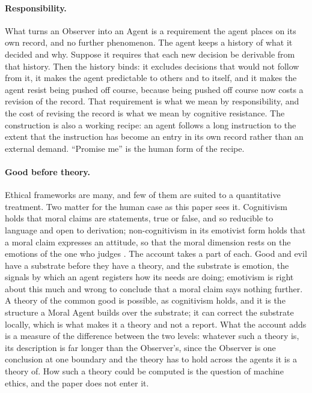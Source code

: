 \paragraph{Responsibility.}
\label{sec:responsibility}
What turns an Observer into an Agent is a requirement the agent places on its own record, and no
further phenomenon. The agent keeps a history of what it decided and why. Suppose it requires that each
new decision be derivable from that history. Then the history binds: it excludes decisions that would
not follow from it, it makes the agent predictable to others and to itself, and it makes the agent
resist being pushed off course, because being pushed off course now costs a revision of the record.
That requirement is what we mean by responsibility, and the cost of revising the record is what we
mean by cognitive resistance. The construction is also a working recipe: an agent follows a long
instruction to the extent that the instruction has become an entry in its own record rather than an
external demand. ``Promise me'' is the human form of the recipe.

\paragraph{Good before theory.}
Ethical frameworks are many, and few of them are suited to a quantitative treatment. Two matter for
the human case as this paper sees it. Cognitivism holds that moral claims are statements, true or
false, and so reducible to language and open to derivation; non-cognitivism in its emotivist form holds
that a moral claim expresses an attitude, so that the moral dimension rests on the emotions of the one
who judges \citep{ayer1936,vanroojen2023}. The account takes a part of each. Good and evil have a
substrate before they have a theory, and the substrate is emotion, the signals by which an
agent registers how its needs are doing; emotivism is right about this
much and wrong to conclude that a moral claim says nothing further. A theory of the common good is
possible, as cognitivism holds, and it is the structure a Moral Agent builds over the substrate; it
can correct the substrate locally, which is what makes it a theory and not a report. What the account
adds is a measure of the difference between the two levels: whatever such a theory is, its description
is far longer than the Observer's, since the Observer is one conclusion at one boundary and the theory
has to hold across the agents it is a theory of. How such a theory could be computed is the question
of machine ethics, and the paper does not enter it.


